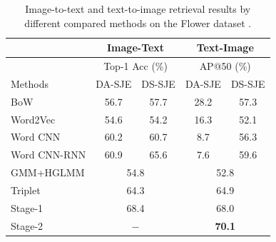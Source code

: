 \begin{table}[]
\small
\centering
\begin{tabular}{|l|c|c|c|c|}
\hline
             & \multicolumn{2}{c|}{Image-Text} & \multicolumn{2}{c|}{Text-Image}                           \\ \hline
             & \multicolumn{2}{c|}{Top-1 Acc (\%)} & \multicolumn{2}{c|}{AP@50 (\%)}                           \\ \hline
Methods      & DA-SJE        & DS-SJE              & DA-SJE                      & DS-SJE                      \\ \hline
BoW \cite{harris1954distributional}       & 56.7          & 57.7                & 28.2                        & 57.3                        \\ \hline
Word2Vec \cite{mikolov2013distributed}     & 54.6          & 54.2                & 16.3                        & 52.1                        \\ \hline
Word CNN \cite{reed2016learning}    & 60.2          & 60.7                & 8.7                         & 56.3                        \\ \hline
Word CNN-RNN \cite{reed2016learning} & 60.9          & 65.6                & 7.6                         & 59.6                        \\ \hline
GMM+HGLMM \cite{klein2015associating} & \multicolumn{2}{c|}{54.8}           & \multicolumn{2}{c|}{52.8} \\ \hline
Triplet	 & \multicolumn{2}{c|}{64.3}           & \multicolumn{2}{c|}{64.9} \\ \hline
\hline
Stage-1      & \multicolumn{2}{c|}{68.4}           & \multicolumn{2}{c|}{68.0}                                 \\ \hline
Stage-2      & \multicolumn{2}{c|}{$-$}               & \multicolumn{2}{c|}{{\textbf{70.1}}} \\ \hline
\end{tabular}
\caption{Image-to-text and text-to-image retrieval results by different compared methods on the Flower dataset \cite{reed2016learning}.}
\label{tab:Flower_dataset}
\end{table}


